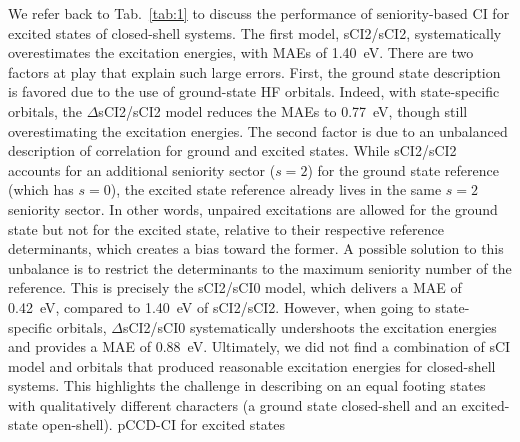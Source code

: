 \documentclass[aip,jcp,reprint,noshowkeys,superscriptaddress]{revtex4-1}
\begin{document}
We refer back to Tab.~\ref{tab:1} to discuss the performance of seniority-based CI for excited states of closed-shell systems.
The first model, sCI2/sCI2, systematically overestimates the excitation energies, with MAEs of \SI{1.40}{\eV}.
There are two factors at play that explain such large errors.
First, the ground state description is favored due to the use of ground-state HF orbitals.
Indeed, with state-specific orbitals, the $\Delta$sCI2/sCI2 model reduces the MAEs to \SI{0.77}{\eV}, though still overestimating the excitation energies.
The second factor is due to an unbalanced description of correlation for ground and excited states.
While sCI2/sCI2 accounts for an additional seniority sector ($s=2$) for the ground state reference (which has $s=0$), 
the excited state reference already lives in the same $s=2$ seniority sector.
In other words, unpaired excitations are allowed for the ground state but not for the excited state, relative to their respective reference determinants, which creates a bias toward the former.
A possible solution to this unbalance is to restrict the determinants to the maximum seniority number of the reference.
This is precisely the sCI2/sCI0 model, which delivers a MAE of \SI{0.42}{\eV}, compared to \SI{1.40}{\eV} of sCI2/sCI2.
However, when going to state-specific orbitals, $\Delta$sCI2/sCI0 systematically undershoots the excitation energies and provides a MAE of \SI{0.88}{\eV}.
Ultimately, we did not find a combination of sCI model and orbitals that produced reasonable excitation energies for closed-shell systems.
This highlights the challenge in describing on an equal footing states with qualitatively different characters (a ground state closed-shell and an excited-state open-shell).
pCCD-CI for excited states \cite{Nowak_2023}
\end{document}
